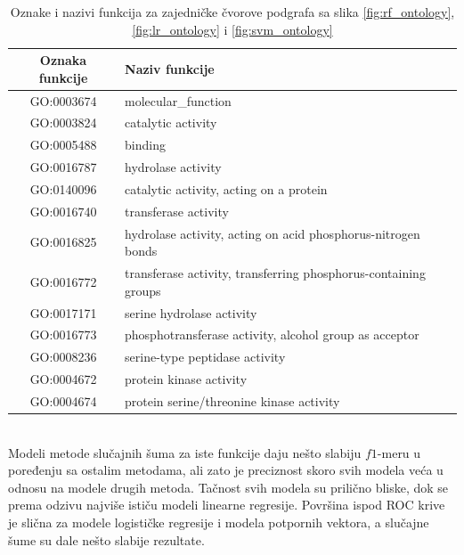 \begin{table}[H]
	\centering
	\begin{tabular}{|c|l|}
		\hline
		Oznaka funkcije & Naziv funkcije \\
		\hline
		GO:0003674 & molecular\_function\\
		\hline
		GO:0003824 & catalytic activity\\
		\hline
		GO:0005488 & binding\\
		\hline
		GO:0016787 & hydrolase activity\\
		\hline
		GO:0140096 & catalytic activity, acting on a protein\\
		\hline
		GO:0016740 & transferase activity\\
		\hline
		GO:0016825 & hydrolase activity, acting on acid phosphorus-nitrogen bonds \\
		\hline
		GO:0016772 & transferase activity, transferring phosphorus-containing groups\\
		\hline
		GO:0017171 & serine hydrolase activity \\
		\hline
		GO:0016773 & phosphotransferase activity, alcohol group as acceptor \\
		\hline
		GO:0008236 & serine-type peptidase activity \\
		\hline
		GO:0004672 & protein kinase activity \\
		\hline
		GO:0004674 & protein serine/threonine kinase activity \\
		\hline
	\end{tabular}
	\caption{Oznake i nazivi funkcija za zajedničke čvorove podgrafa sa slika \ref{fig:rf_ontology}, \ref{fig:lr_ontology} i \ref{fig:svm_ontology}} 
	\label{tab: commonNames}
\end{table}


~\\

Modeli metode slučajnih šuma za iste funkcije daju nešto slabiju $f1$-meru u poređenju sa ostalim metodama, ali zato je preciznost skoro svih modela veća u odnosu na modele drugih metoda. Tačnost svih modela su prilično bliske, dok se prema odzivu najviše ističu modeli linearne regresije. Površina ispod ROC krive je slična za modele logističke regresije i modela potpornih vektora, a slučajne šume su dale nešto slabije rezultate.



